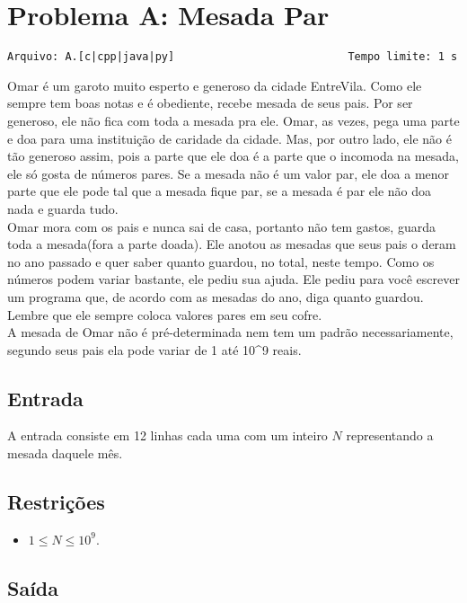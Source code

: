 \section{Problema A: Mesada Par}
\vspace{-0.52cm}
\noindent \begin{verbatim}Arquivo: A.[c|cpp|java|py]                           Tempo limite: 1 s
\end{verbatim}

Omar é um garoto muito esperto e generoso da cidade EntreVila. Como ele sempre tem boas notas e é obediente, recebe mesada de seus pais. Por ser generoso, ele não fica com toda a mesada pra ele. Omar, as vezes, pega uma parte e doa para uma instituição de caridade da cidade. Mas, por outro lado, ele não é tão generoso assim, pois a parte que ele doa é a parte que o incomoda na mesada, ele só gosta de números pares. Se a mesada não é um valor par, ele doa a menor parte que ele pode tal que a mesada fique par, se a mesada é par ele não doa nada e guarda tudo.\\
Omar mora com os pais e nunca sai de casa, portanto não tem gastos, guarda toda a mesada(fora a parte doada). Ele anotou as mesadas que seus pais o deram no ano passado e quer saber quanto guardou, no total, neste tempo. Como os números podem variar bastante, ele pediu sua ajuda. Ele pediu para você escrever um programa que, de acordo com as mesadas do ano, diga quanto guardou. Lembre que ele sempre coloca valores pares em seu cofre.\\

A mesada de Omar não é pré-determinada nem tem um padrão necessariamente, segundo seus pais ela pode variar de 1 até 10^{9} reais.

\subsection*{Entrada}

A entrada consiste em 12 linhas cada uma com um inteiro $N$ representando a mesada daquele mês.

\subsection*{Restrições}
\begin{itemize}
    \item $1 \le N \le 10^{9}$.
\end{itemize}

\subsection*{Saída}

